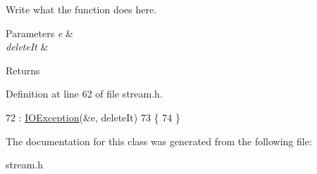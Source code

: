 Write what the function does here. 


\begin{DoxyParams}{Parameters}
{\em e} & \\
\hline
{\em delete\+It} & \\
\hline
\end{DoxyParams}
\begin{DoxyReturn}{Returns}

\end{DoxyReturn}


Definition at line 62 of file stream.\+h.


\begin{DoxyCode}
72             : \hyperlink{classIOException_a73fcf78b1b5820aa158680e896f0b983}{IOException}(&e, deleteIt)
73             \{
74             \}
\end{DoxyCode}


The documentation for this class was generated from the following file\+:\begin{DoxyCompactItemize}
\item 
stream.\+h\end{DoxyCompactItemize}
